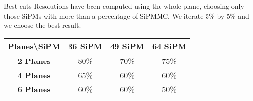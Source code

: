 \documentclass{beamer}
\begin{document}
\begin{frame}{Best cuts}
Resolutions have been computed using the whole plane, choosing only those SiPMs with more than a percentage of SiPMMC.
We iterate 5\% by 5\% and we choose the best result.
\begin{center}
 \begin{tabular}{c|ccc|}
  \toprule
  Planes\textbackslash SiPM & \textbf{36 SiPM} & \textbf{49 SiPM} & \textbf{64 SiPM} \\
   \hline
  \textbf{2 Planes} & 80\% & 70\% & 75\% \\
  \textbf{4 Planes} & 65\% & 60\% & 60\% \\
  \textbf{6 Planes} & 60\% & 60\% & 50\% \\
    \toprule
 \end{tabular}
\end{center}
\end{frame}
\end{document}
